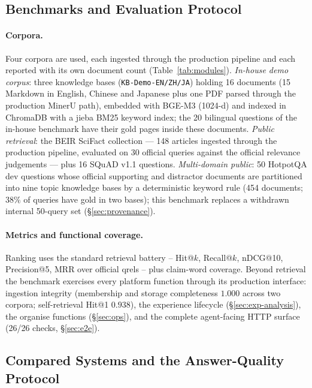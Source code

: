 \documentclass[sigconf, review, anonymous]{acmart}
\begin{document}
\subsection{Benchmarks and Evaluation Protocol}\label{sec:setup}
\paragraph{Corpora.} Four corpora are used, each ingested through the production
pipeline and each reported with its own document count (Table~\ref{tab:modules}).
\emph{In-house demo corpus}: three knowledge bases (\texttt{KB-Demo-EN/ZH/JA})
holding 16 documents (15 Markdown in English, Chinese and Japanese plus one PDF
parsed through the production MinerU path), embedded with BGE-M3 (1024-d)
\cite{chen2024bgem3} and indexed in ChromaDB with a jieba BM25 keyword index;
the 20 bilingual questions of the in-house benchmark have their gold pages
inside these documents.
\emph{Public retrieval}: the BEIR SciFact collection \cite{thakur2021beir} ---
148 articles ingested through the production pipeline, evaluated on 30 official
queries against the official relevance judgements --- plus 16 SQuAD v1.1
questions. \emph{Multi-domain public}: 50 HotpotQA dev questions
\cite{yang2018hotpotqa} whose official supporting and distractor documents are
partitioned into nine topic knowledge bases by a deterministic keyword rule
(454 documents; $38\%$ of queries have gold in two bases); this benchmark
replaces a withdrawn internal 50-query set (\S\ref{sec:provenance}).

\paragraph{Metrics and functional coverage.} Ranking uses the standard
retrieval battery -- Hit@$k$, Recall@$k$, nDCG@10, Precision@5, MRR over
official qrels -- plus claim-word coverage. Beyond retrieval the benchmark
exercises every platform function through its production interface: ingestion
integrity (membership and storage completeness $1.000$ across two corpora;
self-retrieval Hit@1 $0.938$), the experience lifecycle
(\S\ref{sec:exp-analysis}), the organise functions (\S\ref{sec:ops}), and the
complete agent-facing HTTP surface (26/26 checks, \S\ref{sec:e2e}).

\subsection{Compared Systems and the Answer-Quality Protocol}\label{sec:systems}
\end{document}
